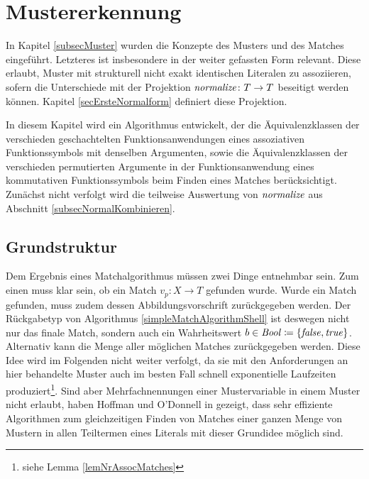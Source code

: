 

\chapter{Mustererkennung} \label{secPattermatching}

In Kapitel \ref{subsecMuster} wurden die Konzepte des Musters und des Matches eingeführt. Letzteres ist insbesondere in der weiter gefassten Form relevant. Diese erlaubt, Muster mit strukturell nicht exakt identischen Literalen zu assoziieren, sofern die Unterschiede mit der Projektion $\mathit{normalize} \colon T \rightarrow T$ beseitigt werden können. 
Kapitel \ref{secErsteNormalform} definiert diese Projektion.

In diesem Kapitel wird ein Algorithmus entwickelt, der die Äquivalenzklassen der verschieden geschachtelten Funktionsanwendungen eines assoziativen Funktionssymbols mit denselben Argumenten, sowie die Äquivalenzklassen der verschieden permutierten Argumente in der Funktionsanwendung eines kommutativen Funktionssymbols beim Finden eines Matches berücksichtigt. Zunächst nicht verfolgt wird die teilweise Auswertung von $\mathit{normalize}$ aus Abschnitt \ref{subsecNormalKombinieren}.


\section{Grundstruktur} \label{subsecPatternmatchingGrundstruktur}

Dem Ergebnis eines Matchalgorithmus müssen zwei Dinge entnehmbar sein. Zum einen muss klar sein, ob ein Match $v_p \colon X \rightarrow T$ gefunden wurde. Wurde ein Match gefunden, muss zudem dessen Abbildungsvorschrift zurückgegeben werden. Der Rückgabetyp von Algorithmus \ref{simpleMatchAlgorithmShell} ist deswegen nicht nur das finale Match, sondern auch ein Wahrheitswert $b \in \mathit{Bool} \coloneqq \{\mathit{false}, \mathit{true}\}$. Alternativ kann die Menge aller möglichen Matches zurückgegeben werden. Diese Idee wird im Folgenden nicht weiter verfolgt, da sie mit den Anforderungen an hier behandelte Muster auch im besten Fall schnell exponentielle Laufzeiten produziert\footnote{siehe Lemma \ref{lemNrAssocMatches}}. Sind aber Mehrfachnennungen einer Mustervariable in einem Muster nicht erlaubt, haben Hoffman und O'Donnell in \cite{patternMatchingInTrees} gezeigt, dass sehr effiziente Algorithmen zum gleichzeitigen Finden von Matches einer ganzen Menge von Mustern in allen Teiltermen eines Literals mit dieser Grundidee möglich sind.\\

